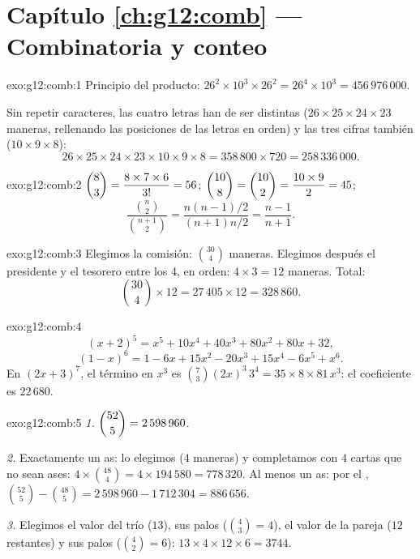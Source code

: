 \section*{Capítulo \ref{ch:g12:comb} --- Combinatoria y conteo}

\begin{solution}{exo:g12:comb:1}
Principio del producto:
$26^2 \times 10^3 \times 26^2 = 26^4 \times 10^3 = 456\,976\,000$.

Sin repetir caracteres, las cuatro letras han de ser distintas
($26 \times 25 \times 24 \times 23$ maneras, rellenando las posiciones de
las letras en orden) y las tres cifras también
($10 \times 9 \times 8$):
\[
26 \times 25 \times 24 \times 23 \times 10 \times 9 \times 8
= 358\,800 \times 720 = 258\,336\,000 .
\]
\end{solution}

\begin{solution}{exo:g12:comb:2}
$\dbinom83 = \dfrac{8 \times 7 \times 6}{3!} = 56$;
$\dbinom{10}{8} = \dbinom{10}{2} = \dfrac{10 \times 9}{2} = 45$;
\[
\frac{\binom n2}{\binom{n+1}2}
= \frac{n(n-1)/2}{(n+1)n/2} = \frac{n-1}{n+1}.
\]
\end{solution}

\begin{solution}{exo:g12:comb:3}
Elegimos la comisión: $\binom{30}{4}$ maneras. Elegimos después el
presidente y el tesorero entre los 4, en orden: $4 \times 3 = 12$ maneras.
Total:
\[
\binom{30}{4} \times 12 = 27\,405 \times 12 = 328\,860 .
\]
\end{solution}

\begin{solution}{exo:g12:comb:4}
\[
(x+2)^5 = x^5 + 10x^4 + 40x^3 + 80x^2 + 80x + 32 ,
\]
\[
(1-x)^6 = 1 - 6x + 15x^2 - 20x^3 + 15x^4 - 6x^5 + x^6 .
\]
En $(2x+3)^7$, el término en $x^3$ es
$\binom{7}{3}(2x)^3\,3^4 = 35 \times 8 \times 81\, x^3$: el coeficiente es
$22\,680$.
\end{solution}

\begin{solution}{exo:g12:comb:5}
\emph{1.} $\dbinom{52}{5} = 2\,598\,960$.

\emph{2.} Exactamente un as: lo elegimos ($4$ maneras) y completamos con
$4$ cartas que no sean ases:
$4 \times \binom{48}{4} = 4 \times 194\,580 = 778\,320$. Al menos un as:
por el ,
$\binom{52}{5} - \binom{48}{5} = 2\,598\,960 - 1\,712\,304 = 886\,656$.

\emph{3.} Elegimos el valor del trío ($13$), sus palos
($\binom43 = 4$), el valor de la pareja ($12$ restantes) y sus palos
($\binom42 = 6$): $13 \times 4 \times 12 \times 6 = 3744$.
\end{solution}

